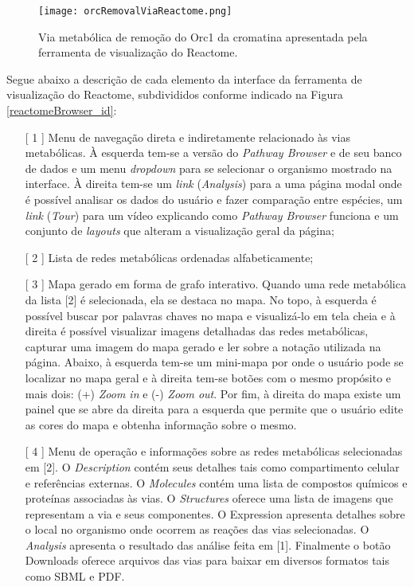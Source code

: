 \begin{figure}[!h]
\centering
\texttt{[image: orcRemovalViaReactome.png]}
\caption{Via metabólica de remoção do Orc1 da cromatina apresentada pela ferramenta de visualização do Reactome.}
\label{orcRemovalViaReactome}
\end{figure}

\indent Segue abaixo a descrição de cada elemento da interface da ferramenta de visualização do Reactome, subdivididos  conforme indicado na Figura \ref{reactomeBrowser_id}:

\begin{itemize}
\item[[ 1]] Menu de navegação direta e indiretamente relacionado às vias metabólicas. À esquerda tem-se a versão do \textit{Pathway Browser} e de seu banco de dados e um menu \textit{dropdown} para se selecionar o organismo mostrado na interface. À direita tem-se um \textit{link} (\textit{Analysis}) para a uma página modal onde é possível analisar os dados do usuário e fazer comparação entre espécies, um \textit{link} (\textit{Tour}) para um vídeo explicando como \textit{Pathway Browser} funciona e um conjunto de \textit{layouts} que alteram a visualização geral da página;
\item[[ 2]] Lista de redes metabólicas ordenadas alfabeticamente;
\item[[ 3]] Mapa gerado em forma de grafo interativo. Quando uma rede metabólica da lista [2] é selecionada, ela se destaca no mapa. No topo, à esquerda é possível buscar por palavras chaves no mapa e visualizá-lo em tela cheia e à direita é possível visualizar imagens detalhadas das redes metabólicas, capturar uma imagem do mapa gerado e ler sobre a notação utilizada na página. Abaixo, à esquerda tem-se um mini-mapa por onde o usuário pode se localizar no mapa geral e à direita tem-se botões com o mesmo propósito e mais dois: (+) \textit{Zoom in} e (-) \textit{Zoom out}. Por fim, à direita do mapa existe um painel que se abre da direita para a esquerda que permite que o usuário edite as cores do mapa e obtenha informação sobre o mesmo.
\item[[ 4]] Menu de operação e informações sobre as redes metabólicas selecionadas em [2]. O \textit{Description} contém seus detalhes tais como compartimento celular e referências externas. O \textit{Molecules} contém uma lista de compostos químicos e proteínas associadas às vias. O \textit{Structures} oferece uma lista de imagens que representam a via e seus componentes. O Expression apresenta detalhes sobre o local no organismo onde ocorrem as reações das vias selecionadas. O \textit{Analysis} apresenta o resultado das análise feita em [1]. Finalmente o botão Downloads oferece arquivos das vias para baixar em diversos formatos tais como SBML e PDF. 
\end{itemize}
\textbf{ }\\


